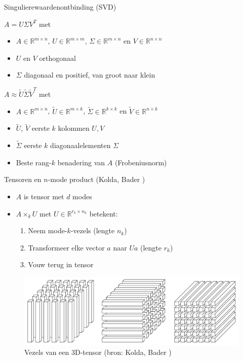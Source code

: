 \documentclass[t,12pt,dutch
\ifx\beamermode\undefined\else,\beamermode\fi
]{beamer}
\begin{document}
\begin{frame}{Singulierewaardenontbinding (SVD)}

$A = U \Sigma V^T$ met 
\begin{itemize}
\item $A \in \mathbb{R}^{m \times n}$, $U \in \mathbb{R}^{m \times m}$, $\Sigma \in \mathbb{R}^{m \times n}$ en $V \in \mathbb{R}^{n \times n}$
\item $U$ en $V$ orthogonaal
\item $\Sigma$ diagonaal en positief, van groot naar klein
\newline
\end{itemize}
$A \approx \widetilde{U} \widetilde{\Sigma} \widetilde{V}^T$ met 
\begin{itemize}
\item $A \in \mathbb{R}^{m \times n}$, $\widetilde{U} \in \mathbb{R}^{m \times k}$, $\widetilde{\Sigma} \in \mathbb{R}^{k \times k}$ en $\widetilde{V} \in \mathbb{R}^{n \times k}$
\item $\widetilde{U}$, $\widetilde{V}$ eerste $k$ kolommen $U, V$
\item $\widetilde{\Sigma}$ eerste $k$ diagonaalelementen $\Sigma$
\item Beste rang-$k$ benadering van $A$ (Frobeniusnorm)
\end{itemize}

\end{frame}

\begin{frame}{Tensoren en $n$-mode product (Kolda, Bader \cite{ref:kolda})}

\begin{itemize}
\item $A$ is tensor met $d$ modes
\item $A \times_k U$ met $U \in \mathbb{R}^{r_k \times n_k}$ betekent:
\begin{enumerate}
\item Neem mode-$k$-vezels (lengte $n_k$)
\item Transformeer elke vector $a$ naar $Ua$ (lengte $r_k$)
\item Vouw terug in tensor
\end{enumerate}
\end{itemize}

\begin{figure}[H]
\centering
\includegraphics[scale=0.13]{images/fibers.png}
\caption{Vezels van een 3D-tensor (bron: Kolda, Bader \cite{ref:kolda})}
\end{figure}

\end{frame}
\end{document}
